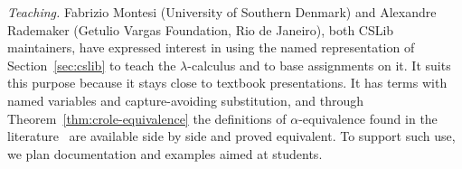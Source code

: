 \emph{Teaching.} Fabrizio Montesi (University of Southern Denmark) and Alexandre
Rademaker (Getulio Vargas Foundation, Rio de Janeiro), both CSLib
maintainers, have expressed interest in using the named
representation of Section~\ref{sec:cslib} to teach the
$\lambda$-calculus and to base assignments on it. It suits this purpose
because it stays close to textbook presentations. It has terms with
named variables and capture-avoiding substitution, and through
Theorem~\ref{thm:crole-equivalence} the definitions of
$\alpha$-equivalence found in the
literature~\cite{barendregt1985a,hindley2008a} are available side by
side and proved equivalent. To support such use, we plan documentation
and examples aimed at students.
